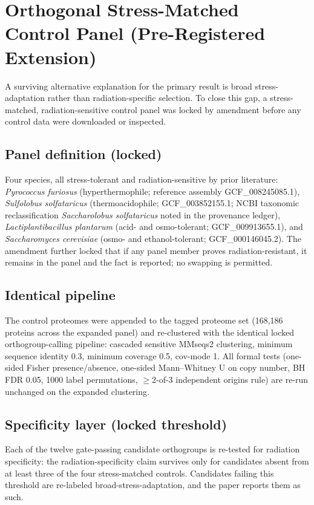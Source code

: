 \section{Orthogonal Stress-Matched Control Panel (Pre-Registered Extension)}
\label{sec:stresspanel}

A surviving alternative explanation for the primary result is broad
stress-adaptation rather than radiation-specific selection. To close this
gap, a stress-matched, radiation-sensitive control panel was locked by
amendment before any control data were downloaded or inspected.

\subsection{Panel definition (locked)}
Four species, all stress-tolerant and radiation-sensitive by prior
literature: \emph{Pyrococcus furiosus} (hyperthermophile; reference
assembly GCF\_008245085.1), \emph{Sulfolobus solfataricus}
(thermoacidophile; GCF\_003852155.1; NCBI taxonomic reclassification
\emph{Saccharolobus solfataricus} noted in the provenance ledger),
\emph{Lactiplantibacillus plantarum} (acid- and osmo-tolerant;
GCF\_009913655.1), and \emph{Saccharomyces cerevisiae} (osmo- and
ethanol-tolerant; GCF\_000146045.2). The amendment further locked that if
any panel member proves radiation-resistant, it remains in the panel and
the fact is reported; no swapping is permitted.

\subsection{Identical pipeline}
The control proteomes were appended to the tagged proteome set (168,186
proteins across the expanded panel) and re-clustered with the identical
locked orthogroup-calling pipeline: cascaded sensitive MMseqs2 clustering,
minimum sequence identity 0.3, minimum coverage 0.5, cov-mode 1. All formal
tests (one-sided Fisher presence/absence, one-sided Mann--Whitney U on copy
number, BH FDR 0.05, 1000 label permutations, $\geq$2-of-3 independent
origins rule) are re-run unchanged on the expanded clustering.

\subsection{Specificity layer (locked threshold)}
Each of the twelve gate-passing candidate orthogroups is re-tested for
radiation specificity: the radiation-specificity claim survives only for
candidates absent from at least three of the four stress-matched controls.
Candidates failing this threshold are re-labeled broad-stress-adaptation,
and the paper reports them as such.
